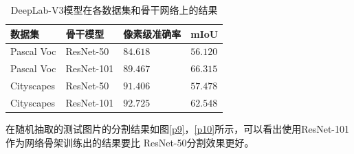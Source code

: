 \documentclass[10pt, a4paper]{article}
\begin{document}
\begin{table}[!htbp]
\begin{center}  
\begin{tabular}{llll}
        \toprule
        数据集 & 骨干模型 & 像素级准确率 & mIoU \\
        \midrule
        Pascal Voc & ResNet-50 & $84.618$ & $56.120$ \\
        Pascal Voc & ResNet-101 & $89.467$ & $66.315$ \\
        Cityscapes & ResNet-50 & $91.406$ & $57.478$ \\
        Cityscapes & ResNet-101 & $92.725$ & $62.548$ \\
        \bottomrule
\end{tabular}
\end{center}
\caption{DeepLab-V3模型在各数据集和骨干网络上的结果}
\label{t3}
\end{table}

在随机抽取的测试图片的分割结果如图\ref{p9}，\ref{p10}所示，可以看出使用ResNet-101作为网络骨架训练出的结果要比
ResNet-50分割效果更好。
\end{document}
